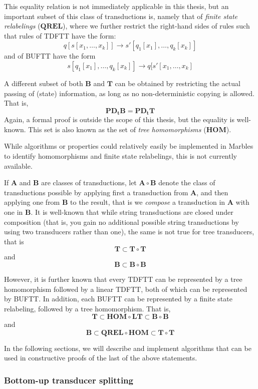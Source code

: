 This equality relation is not immediately applicable in this thesis, but an
important subset of this class of transductions is, namely that of
\emph{finite state relabelings} ($\mathbf{QREL}$), where we further
restrict the right-hand sides of rules such that rules of TDFTT have the
form:
$$q[s[x_1,\ldots,x_k]] \rightarrow s'[q_1[x_1],\ldots,q_k[x_k]]$$ 
and of BUFTT have the form
$$s[q_1[x_1],\ldots,q_k[x_k]] \rightarrow q[s'[x_1,\ldots,x_k]$$

A different subset of both $\mathbf{B}$ and $\mathbf{T}$ can be obtained by
restricting the actual passing of (state) information, as long as no
non-deterministic copying is allowed. That is, 
$$\mathbf{PD_tB} = \mathbf{PD_tT}$$
Again, a formal proof is outside the scope of this thesis, but the equality
is well-known. This set is also known as the set of \emph{tree homomorphisms} 
($\mathbf{HOM}$).

While algorithms or properties could relatively easily be implemented in
Marbles to identify homomorphisms and finite state relabelings, this is not
currently available.

If $\mathbf{A}$ and $\mathbf{B}$ are classes of transductions, let
$\mathbf{A}\circ\mathbf{B}$ denote the class of transductions possible by
applying first a transduction from $\mathbf{A}$, and then applying one from
$\mathbf{B}$ to the result, that is we \emph{compose} a transduction in
$\mathbf{A}$ with one in $\mathbf{B}$. It is well-known that while string
transductions are closed under composition (that is, you gain no additional
possible string transductions by using two transducers rather than one),
the same is not true for tree transducers, that is
$$\mathbf{T} \subset \mathbf{T} \circ \mathbf{T}$$ and
$$\mathbf{B} \subset \mathbf{B} \circ \mathbf{B}$$

However, it is further known that every TDFTT can be represented by a
tree homomorphism followed by a linear TDFTT, both of which can be
represented by BUFTT. In addition, each BUFTT can be represented by a
finite state relabeling, followed by a tree homomorphism. That is,
$$\mathbf{T} \subset \mathbf{HOM} \circ \mathbf{LT} \subset \mathbf{B}
\circ \mathbf{B}$$ and
$$\mathbf{B} \subset \mathbf{QREL} \circ \mathbf{HOM} \subset \mathbf{T}
\circ \mathbf{T}$$

In the following sections, we will describe and implement algorithms that
can be used in constructive proofs of the last of the above statements.

\subsubsection{Bottom-up transducer splitting}

